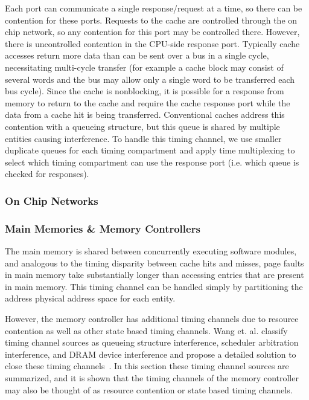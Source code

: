 Each port can communicate a single response/request at a time, so there can be 
contention for these ports. Requests to the cache are controlled through the on 
chip network, so any contention for this port may be controlled there. However, 
there is uncontrolled contention in the CPU-side response port. Typically cache 
accesses return more data than can be sent over a bus in a single cycle, 
necessitating multi-cycle transfer (for example a cache block may consist of 
several words and the bus may allow only a single word to be transferred each 
bus cycle). Since the cache is nonblocking, it is possible for a response from 
memory to return to the cache and require the cache response port while the 
data from a cache hit is being transferred. Conventional caches address this 
contention with a queueing structure, but this queue is shared by multiple 
entities causing interference. To handle this timing channel, we use smaller 
duplicate queues for each timing compartment and apply time multiplexing to 
select which timing compartment can use the response port (i.e. which queue is 
checked for responses).

\subsubsection{On Chip Networks}
\subsubsection{Main Memories \& Memory Controllers}
The main memory is shared between concurrently executing software modules, and 
analogous to the timing disparity between cache hits and misses, page faults in 
main memory take substantially longer than accessing entries that are present 
in main memory. This timing channel can be handled simply by partitioning the 
address physical address space for each entity.

However, the memory controller has additional timing channels due to resource 
contention as well as other state based timing channels. Wang et. al. classify 
timing channel sources as queueing structure interference, scheduler 
arbitration interference, and DRAM device interference and propose a detailed 
solution to close these timing channels~\cite{ushpca14}.  In this section these 
timing channel sources are summarized, and it is shown that the timing channels 
of the memory controller may also be thought of as resource contention or state 
based timing channels.

